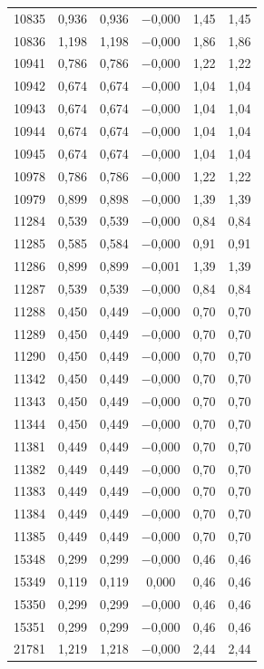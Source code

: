 \begin{longtable}{lccccc}
10835 & 0,936 & 0,936 & $-$0,000 & 1,45 & 1,45 \\
10836 & 1,198 & 1,198 & $-$0,000 & 1,86 & 1,86 \\
10941 & 0,786 & 0,786 & $-$0,000 & 1,22 & 1,22 \\
10942 & 0,674 & 0,674 & $-$0,000 & 1,04 & 1,04 \\
10943 & 0,674 & 0,674 & $-$0,000 & 1,04 & 1,04 \\
10944 & 0,674 & 0,674 & $-$0,000 & 1,04 & 1,04 \\
10945 & 0,674 & 0,674 & $-$0,000 & 1,04 & 1,04 \\
10978 & 0,786 & 0,786 & $-$0,000 & 1,22 & 1,22 \\
10979 & 0,899 & 0,898 & $-$0,000 & 1,39 & 1,39 \\
11284 & 0,539 & 0,539 & $-$0,000 & 0,84 & 0,84 \\
11285 & 0,585 & 0,584 & $-$0,000 & 0,91 & 0,91 \\
11286 & 0,899 & 0,899 & $-$0,001 & 1,39 & 1,39 \\
11287 & 0,539 & 0,539 & $-$0,000 & 0,84 & 0,84 \\
11288 & 0,450 & 0,449 & $-$0,000 & 0,70 & 0,70 \\
11289 & 0,450 & 0,449 & $-$0,000 & 0,70 & 0,70 \\
11290 & 0,450 & 0,449 & $-$0,000 & 0,70 & 0,70 \\
11342 & 0,450 & 0,449 & $-$0,000 & 0,70 & 0,70 \\
11343 & 0,450 & 0,449 & $-$0,000 & 0,70 & 0,70 \\
11344 & 0,450 & 0,449 & $-$0,000 & 0,70 & 0,70 \\
11381 & 0,449 & 0,449 & $-$0,000 & 0,70 & 0,70 \\
11382 & 0,449 & 0,449 & $-$0,000 & 0,70 & 0,70 \\
11383 & 0,449 & 0,449 & $-$0,000 & 0,70 & 0,70 \\
11384 & 0,449 & 0,449 & $-$0,000 & 0,70 & 0,70 \\
11385 & 0,449 & 0,449 & $-$0,000 & 0,70 & 0,70 \\
15348 & 0,299 & 0,299 & $-$0,000 & 0,46 & 0,46 \\
15349 & 0,119 & 0,119 & 0,000 & 0,46 & 0,46 \\
15350 & 0,299 & 0,299 & $-$0,000 & 0,46 & 0,46 \\
15351 & 0,299 & 0,299 & $-$0,000 & 0,46 & 0,46 \\
21781 & 1,219 & 1,218 & $-$0,000 & 2,44 & 2,44 \\

\end{longtable}
